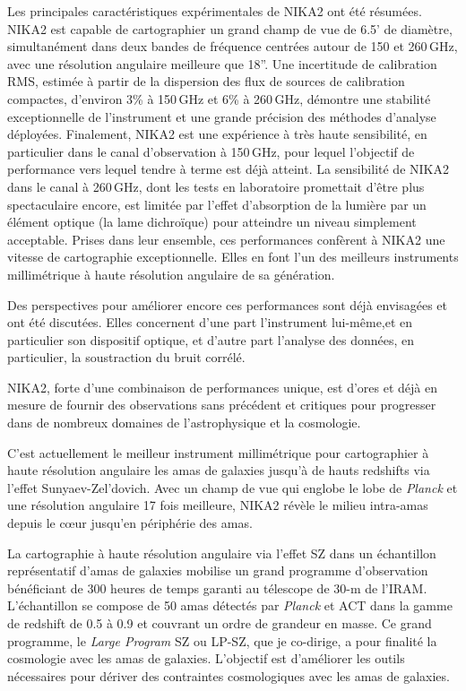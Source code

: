 Les principales caractéristiques expérimentales de NIKA2 ont été résumées. NIKA2 est capable de cartographier un grand champ de vue de 6.5' de diamètre, simultanément dans deux bandes de fréquence centrées autour de 150 et 260\,GHz, avec une résolution angulaire meilleure que 18''. Une incertitude de calibration RMS, estimée à partir de la dispersion des flux de sources de calibration compactes, d'environ 3\% à 150\,GHz et 6\% à 260\,GHz, démontre une stabilité exceptionnelle de l'instrument et une grande précision des méthodes d'analyse déployées. Finalement, NIKA2 est une expérience à très haute sensibilité, en particulier dans le canal d'observation à 150\,GHz, pour lequel l'objectif de performance vers lequel tendre à terme est déjà atteint. La sensibilité de NIKA2 dans le canal à 260\,GHz, dont les tests en laboratoire promettait d'être plus spectaculaire encore, est limitée par l'effet d'absorption de la lumière par un élément optique (la lame dichroïque) pour atteindre un niveau simplement acceptable. Prises dans leur ensemble, ces performances confèrent à NIKA2 une vitesse de cartographie exceptionnelle. Elles en font l'un des meilleurs instruments millimétrique à haute résolution angulaire de sa génération. 

Des perspectives pour améliorer encore ces performances sont déjà envisagées et ont été discutées. Elles concernent d'une part l'instrument lui-même,et en particulier son dispositif optique, et d'autre part l'analyse des données, en particulier, la soustraction du bruit corrélé. 

NIKA2, forte d'une combinaison de performances unique, est d'ores et déjà en mesure de fournir des observations sans précédent et critiques pour progresser dans de nombreux domaines de l'astrophysique et la cosmologie. 

C'est actuellement le meilleur instrument millimétrique pour cartographier à haute résolution angulaire les amas de galaxies jusqu'à de hauts redshifts via l'effet Sunyaev-Zel'dovich. Avec un champ de vue qui englobe le lobe de \emph{Planck} et une résolution angulaire 17 fois meilleure, NIKA2 révèle le milieu intra-amas depuis le c\oe ur jusqu'en périphérie des amas. 

La cartographie à haute résolution angulaire via l'effet SZ dans un échantillon représentatif d'amas de galaxies mobilise un grand programme d'observation bénéficiant de 300 heures de temps garanti au télescope de 30-m de l'IRAM. L'échantillon se compose de 50 amas détectés par \emph{Planck} et ACT dans la gamme de redshift de 0.5 à 0.9 et couvrant un ordre de grandeur en masse. Ce grand programme, le \emph{Large Program} SZ ou LP-SZ, que je co-dirige, a pour finalité la cosmologie avec les amas de galaxies. L'objectif est d'améliorer les outils nécessaires pour dériver des contraintes cosmologiques avec les amas de galaxies. 

